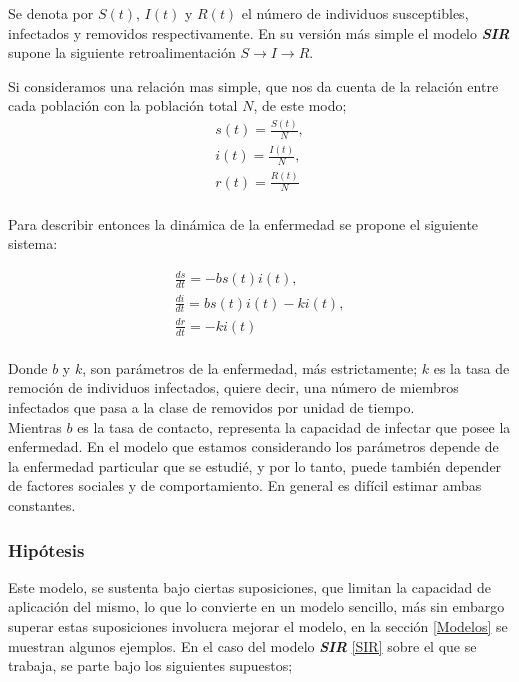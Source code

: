 \documentclass[journal]{IEEEtran}
\begin{document}
Se denota por $S(t)$, $I(t)$ y $R(t)$ el número de individuos susceptibles,
infectados y removidos respectivamente.
En su versión más simple el modelo \textbf{\textit{SIR}} supone la siguiente
retroalimentación $S \rightarrow I \rightarrow R$.\newline

Si consideramos una relación mas simple, que nos da cuenta de la relación entre
cada población con la población total $N$, de este modo;
\begin{equation} \label{poblaciones}
	\begin{split}
		s(t) = \frac{S(t)}{N},\\
		i(t) = \frac{I(t)}{N},\\
		r(t) = \frac{R(t)}{N}\\
	\end{split}
\end{equation}

Para describir entonces la dinámica de la enfermedad se propone el siguiente
sistema:

\begin{equation}\label{SIR}
	\begin{split}
		\frac{ds}{dt} = -bs(t)i(t),\\
		\frac{di}{dt} = bs(t)i(t)-ki(t),\\
		\frac{dr}{dt} = -ki(t)\\
	\end{split}
\end{equation}

Donde $b$ y $k$, son parámetros de la enfermedad, más estrictamente; $k$ es la
tasa de remoción de individuos infectados, quiere decir, una
número de miembros infectados que pasa a la clase de removidos por unidad de
tiempo.\\
Mientras $b$ es la tasa de contacto, representa la capacidad de infectar que
posee la enfermedad. En el modelo que estamos considerando los parámetros
depende de la enfermedad
particular que se estudié, y por lo tanto, puede también depender de factores
sociales y
de comportamiento. En general es difícil estimar ambas constantes.

\subsubsection{Hipótesis}
Este modelo, se sustenta bajo ciertas suposiciones, que limitan la capacidad de
aplicación del mismo, lo que lo convierte en un modelo sencillo,
más sin embargo superar estas suposiciones involucra mejorar el modelo, en la
sección \ref{Modelos} se muestran algunos ejemplos. En el caso del modelo
\textbf{\textit{SIR}} \ref{SIR}
sobre el que se trabaja, se parte bajo los siguientes supuestos;
\end{document}
